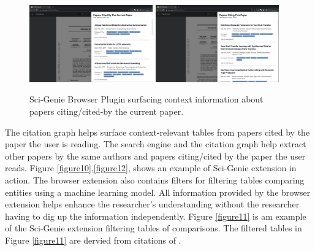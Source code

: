 \begin{figure}[h]
    \includegraphics[width=0.475\textwidth]{src/images/sci-genie-ext-cite-out-exp.png}
    \hfill
    \includegraphics[width=0.475\textwidth]{src/images/sci-genie-ext-cite-exp.png}
    \caption{ Sci-Genie Browser Plugin surfacing context information about papers citing/cited-by the current paper. }
    \label{figure\arabic{figurecounter}}
\end{figure}

The citation graph helps surface context-relevant tables from papers cited by the paper the user is reading.  The search engine and the citation graph help extract other papers by the same authors and papers citing/cited by the paper the user reads. Figure \ref{figure10},\ref{figure12}, shows an example of Sci-Genie extension in action. The browser extension also contains filters for filtering tables comparing entities using a machine learning model. All information provided by the browser extension helps enhance the researcher’s understanding without the researcher having to dig up the information independently. Figure \ref{figure11} is am example of the Sci-Genie extension filtering tables of comparisons. The filtered tables in Figure \ref{figure11} are dervied from citations of \cite{messina2020transformer}. 

